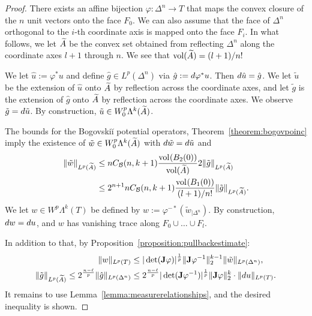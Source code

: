 \documentclass[10pt,a4paper]{article}
\begin{document}
\begin{proof}
    There exists an affine bijection $\varphi : \Delta^n \rightarrow T$ 
    that maps the convex closure of the $n$ unit vectors onto the face $F_0$.
    We can also assume that the face of $\Delta^n$
    orthogonal to the $i$-th coordinate axis is mapped 
    onto the face $F_i$. 
    In what follows, we let $\widetilde {A}$ be the convex set obtained from reflecting $\Delta^n$ along the coordinate axes $l+1$ through $n$. 
    We see that $\operatorname{vol}(\widetilde {A}) = (l+1)/n!$
    
    We let $\hat u := \varphi^{\ast} u$ and define $\hat g \in L^{p}(\Delta^n)$ via $\hat g := d \varphi^{\ast} u$. 
    Then $d \hat u = \hat g$. 
    We let $\tilde u$ be the extension of $\hat u$ onto $\widetilde {A}$ by reflection across the coordinate axes,
    and let $\tilde g$ is the extension of $\hat g$ onto $\widetilde {A}$ by reflection across the coordinate axes. 
    We observe $\tilde g = d \tilde u$. 
    By construction, $\tilde u \in W^{p}_{0}\Lambda^{k}(\widetilde {A})$.
    
    The bounds for the Bogovski\u{i} potential operators, Theorem~\ref{theorem:bogovpoinc} imply 
    the existence of $\tilde w \in W^{p}_{0}\Lambda^{k}(\widetilde {A})$
    with $d \tilde w = d \tilde u$ and 
    \begin{align*}
        \| \tilde w \|_{L^{p}(\widetilde {A})}
        &\leq 
        n C_{{\mathcal B}}(n,k+1) \frac{ \operatorname{vol}_{}(B_2(0)) }{ \operatorname{vol}(\widetilde {A}) } 
        2
        \| \tilde g \|_{L^{p}(\widetilde {A})}
        \\&\leq 
        2^{n+1} n C_{{\mathcal B}}(n,k+1) \frac{ \operatorname{vol}_{}(B_1(0)) }{ (l+1)/n! } 
        \| \tilde g \|_{L^{p}(\widetilde {A})}
        .
    \end{align*}
    We let $w \in W^{p}\Lambda^{k}(T)$ be defined by $w := \varphi^{-\ast} ( \tilde w_{|\Delta^n} )$.
    By construction, $d w = d u$,
    and $w$ has vanishing trace along $F_{0} \cup \dots \cup F_{l}$.
    
    In addition to that, by Proposition~\ref{proposition:pullbackestimate}:
    \begin{align*}
        \| w \|_{L^{p}(T)}
        &\leq 
        |\det({\mathbf{J}} \varphi)|^{\frac 1 p} 
        \|  {\mathbf{J}} \varphi^{-1}  \|_{2}^{k-1}
        \| \tilde w \|_{L^{p}(\Delta^n)}
        ,
        \\
        \| \tilde g \|_{L^{p}(\widetilde {A})}
        \leq 
        2^{\frac {n-\ell} p}
        \| \hat g \|_{L^{p}(\Delta^n)}
        &\leq 
        2^{\frac {n-\ell} p}
        |\det( {\mathbf{J}} \varphi^{-1} )|^{\frac 1 p} 
        \| {\mathbf{J}} \varphi \|_{2}^{k}
        \cdot 
        \| d u \|_{L^{p}(T)}
        .
    \end{align*}
    It remains to use Lemma~\ref{lemma:measurerelationships}, and the desired inequality is shown. 
\end{proof}
\end{document}
